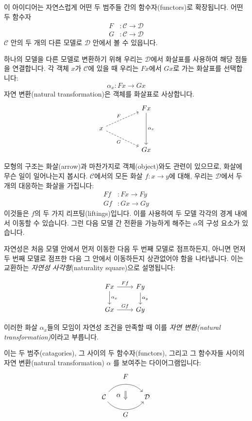 \documentclass[DaoFP]{subfiles}
\begin{document}
이 아이디어는 자연스럽게 어떤 두 범주들 간의 함수자(functors)로 확장됩니다. 어떤 두 함수자
\begin{align*}
F &\colon \mathcal{C} \to \mathcal{D} \\
G &\colon \mathcal{C} \to \mathcal{D}
\end{align*}
$\mathcal{C}$ 안의 두 개의 다른 모델로 $\mathcal{D}$ 안에서 볼 수 있읍니다.

하나의 모델을 다른 모델로 변환하기 위해 우리는 $\mathcal{D}$에서 화살표를 사용하여 해당 점들을 연결합니다. 각 객체 $x$가 $\mathcal{C}$에 있을 때 우리는 $F x$에서 $G x$로 가는 화살표를 선택합니다:
\[ \alpha_x \colon F x \to G x \]
자연 변환(natural transformation)은 객체를 화살표로 사상합니다.
\[
 \begin{tikzcd}
 && F x
 \arrow[dd, "\alpha_x"]
 \\
 x
 \arrow[rru, dashed, "F"]
 \arrow[rrd, dashed, "G"']
 \\
 && G x
 \end{tikzcd}
\]


모형의 구조는 화살(arrow)과 마찬가지로 객체(object)와도 관련이 있으므로, 화살에 무슨 일이 일어나는지 봅시다. $\mathcal{C}$에서의 모든 화살 $f \colon x \to y$에 대해, 우리는 $\mathcal{D}$에서 두 개의 대응하는 화살을 가집니다:
\begin{align*}
 F f &\colon F x \to F y \\
G f &\colon G x \to G y 
\end{align*}
이것들은 $f$의 두 가지 리프팅(liftings)입니다. 이를 사용하여 두 모델 각각의 경계 내에서 이동할 수 있습니다. 그런 다음 모델 간 전환을 가능하게 해주는 $\alpha$의 구성 요소가 있습니다.

자연성은 처음 모델 안에서 먼저 이동한 다음 두 번째 모델로 점프하든지, 아니면 먼저 두 번째 모델로 점프한 다음 그 안에서 이동하든지 상관없어야 함을 나타냅니다. 이는 교환하는 \emph{자연성 사각형}(naturality square)으로 설명됩니다:


\[
 \begin{tikzcd}
 F x
 \arrow[d, "\alpha_x"]
 \arrow[r, "F f"]
 &
F y
  \arrow[d, "\alpha_y"]
 \\
G x
 \arrow[r, "G f"]
& G y
 \end{tikzcd}
\]

이러한 화살 $\alpha_x$들의 모임이 자연성 조건을 만족할 때 이를 \emph{자연 변환(natural transformation)}이라고 부릅니다.

이는 두 범주(catagories), 그 사이의 두 함수자(functors), 그리고 그 함수자들 사이의 자연 변환(natural transformation) $\alpha$ 를 보여주는 다이어그램입니다:
\[
\begin{tikzcd}[column sep=huge]
\mathcal{C}
  \arrow[bend left=50]{r}[name=U, label=above:$F$]{}
  \arrow[bend right=50]{r}[name=D, label=below:$G$]{} 
 &
\mathcal{D}
  \arrow[shorten <=10pt,shorten >=10pt,Rightarrow,to path={(U) -- node[label=left:$\alpha$] {} (D)}]{}
\end{tikzcd}
\]
\end{document}
